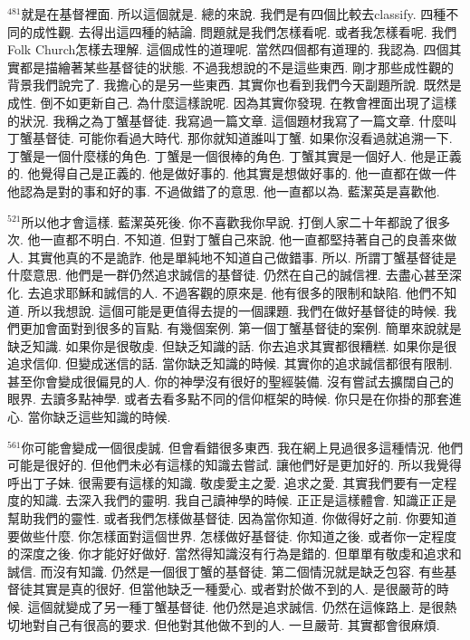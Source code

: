 \documentclass{book}
\begin{document}
$^{481}$就是在基督裡面.
所以這個就是.
總的來說.
我們是有四個比較去classify.
四種不同的成性觀.
去得出這四種的結論.
問題就是我們怎樣看呢.
或者我怎樣看呢.
我們Folk Church怎樣去理解.
這個成性的道理呢.
當然四個都有道理的.
我認為.
四個其實都是描繪著某些基督徒的狀態.
不過我想說的不是這些東西.
剛才那些成性觀的背景我們說完了.
我擔心的是另一些東西.
其實你也看到我們今天副題所說.
既然是成性.
倒不如更新自己.
為什麼這樣說呢.
因為其實你發現.
在教會裡面出現了這樣的狀況.
我稱之為丁蟹基督徒.
我寫過一篇文章.
這個題材我寫了一篇文章.
什麼叫丁蟹基督徒.
可能你看過大時代.
那你就知道誰叫丁蟹.
如果你沒看過就追溯一下.
丁蟹是一個什麼樣的角色.
丁蟹是一個很棒的角色.
丁蟹其實是一個好人.
他是正義的.
他覺得自己是正義的.
他是做好事的.
他其實是想做好事的.
他一直都在做一件他認為是對的事和好的事.
不過做錯了的意思.
他一直都以為.
藍潔英是喜歡他.

$^{521}$所以他才會這樣.
藍潔英死後.
你不喜歡我你早說.
打倒人家二十年都說了很多次.
他一直都不明白.
不知道.
但對丁蟹自己來說.
他一直都堅持著自己的良善來做人.
其實他真的不是詭詐.
他是單純地不知道自己做錯事.
所以.
所謂丁蟹基督徒是什麼意思.
他們是一群仍然追求誠信的基督徒.
仍然在自己的誠信裡.
去盡心甚至深化.
去追求耶穌和誠信的人.
不過客觀的原來是.
他有很多的限制和缺陷.
他們不知道.
所以我想說.
這個可能是更值得去提的一個課題.
我們在做好基督徒的時候.
我們更加會面對到很多的盲點.
有幾個案例.
第一個丁蟹基督徒的案例.
簡單來說就是缺乏知識.
如果你是很敬虔.
但缺乏知識的話.
你去追求其實都很糟糕.
如果你是很追求信仰.
但變成迷信的話.
當你缺乏知識的時候.
其實你的追求誠信都很有限制.
甚至你會變成很偏見的人.
你的神學沒有很好的聖經裝備.
沒有嘗試去擴闊自己的眼界.
去讀多點神學.
或者去看多點不同的信仰框架的時候.
你只是在你掛的那套進心.
當你缺乏這些知識的時候.

$^{561}$你可能會變成一個很虔誠.
但會看錯很多東西.
我在網上見過很多這種情況.
他們可能是很好的.
但他們未必有這樣的知識去嘗試.
讓他們好是更加好的.
所以我覺得呼出丁子妹.
很需要有這樣的知識.
敬虔愛主之愛.
追求之愛.
其實我們要有一定程度的知識.
去深入我們的靈明.
我自己讀神學的時候.
正正是這樣體會.
知識正正是幫助我們的靈性.
或者我們怎樣做基督徒.
因為當你知道.
你做得好之前.
你要知道要做些什麼.
你怎樣面對這個世界.
怎樣做好基督徒.
你知道之後.
或者你一定程度的深度之後.
你才能好好做好.
當然得知識沒有行為是錯的.
但單單有敬虔和追求和誠信.
而沒有知識.
仍然是一個很丁蟹的基督徒.
第二個情況就是缺乏包容.
有些基督徒其實是真的很好.
但當他缺乏一種愛心.
或者對於做不到的人.
是很嚴苛的時候.
這個就變成了另一種丁蟹基督徒.
他仍然是追求誠信.
仍然在這條路上.
是很熱切地對自己有很高的要求.
但他對其他做不到的人.
一旦嚴苛.
其實都會很麻煩.
\end{document}
